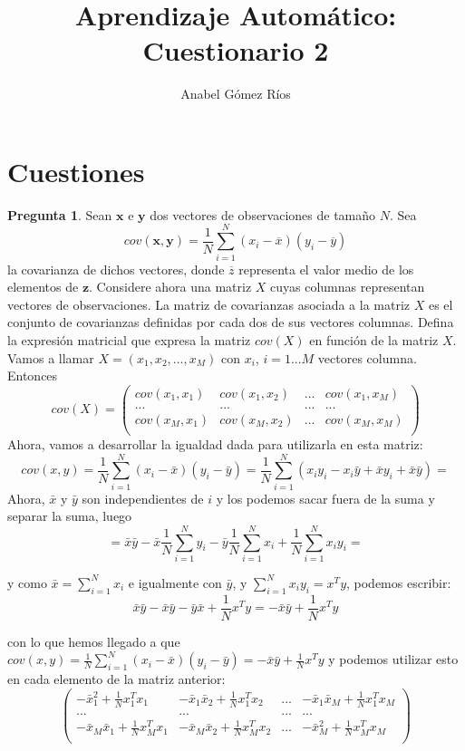 \documentclass[12pt]{article}
\title{Aprendizaje Automático: Cuestionario 2}
\author{Anabel G\'omez R\'ios}
\theoremstyle{definition}
\begin{document}
\maketitle

\newtheorem{pregunta}{Pregunta}

\section{Cuestiones}
\begin{pregunta}
Sean $\mathbf{x}$ e $\mathbf{y}$ dos vectores de observaciones de tamaño $N$. Sea
\[
	cov(\mathbf{x},\mathbf{y})=\frac{1}{N}\sum_{i=1}^N(x_i-\overline{x})(y_i - \overline{y})
\]
la covarianza de dichos vectores, donde $\overline{z}$ representa el valor medio de los elementos de $\mathbf{z}$. Considere ahora una matriz $X$ cuyas columnas representan vectores de observaciones. La matriz de covarianzas asociada a la matriz $X$ es el conjunto de covarianzas definidas por cada dos de sus vectores columnas. Defina la expresión matricial que expresa la matriz $cov(X)$ en función de la matriz $X$.\\

Vamos a llamar $X=(x_1,x_2,...,x_M)$ con $x_i$, $i=1...M$ vectores columna. Entonces
\[ cov(X) = \left( \begin{array}{cccc}
		cov(x_1,x_1) & cov(x_1,x_2) & ... & cov(x_1,x_M) \\
		... & ... & ... & ...\\
		cov(x_M,x_1) & cov(x_M, x_2) & ... & cov(x_M, x_M) \\ \end{array} \right)   
\]
Ahora, vamos a desarrollar la igualdad dada para utilizarla en esta matriz:
\[
	cov(x,y)=\frac{1}{N}\sum_{i=1}^N(x_i-\bar{x})(y_i-\bar{y}) = \frac{1}{N} \sum_{i=1}^N(x_iy_i-x_i\bar{y}+\bar{x}y_i+\bar{x}\bar{y}) =
\]
Ahora, $\bar{x}$ y $\bar{y}$ son independientes de $i$ y los podemos sacar fuera de la suma y separar la suma, luego
\[
	= \bar{x}\bar{y} -\bar{x}\frac{1}{N}\sum_{i=1}^Ny_i - \bar{y}\frac{1}{N} \sum_{i=1}^Nx_i + \frac{1}{N}\sum_{i=1}^Nx_iy_i = 
\]

y como $\bar{x} = \sum_{i=1}^N x_i$ e igualmente con $\bar{y}$, y $\sum_{i=1}^N x_iy_i= x^Ty$, podemos escribir:
\[
	\bar{x}\bar{y} - \bar{x}\bar{y} - \bar{y}\bar{x} + \frac{1}{N}x^Ty = -\bar{x}\bar{y} + \frac{1}{N}x^Ty
\]

con lo que hemos llegado a que $cov(x,y)=\frac{1}{N}\sum_{i=1}^N(x_i-\bar{x})(y_i-\bar{y}) = -\bar{x}\bar{y} + \frac{1}{N}x^Ty$ y podemos utilizar esto en cada elemento de la matriz anterior:
\[ \left( \begin{array}{cccc}
		-\bar{x}_1^2 + \frac{1}{N}x_1^Tx_1 & -\bar{x}_1\bar{x}_2 + \frac{1}{N}x_1^Tx_2 & ... & -\bar{x}_1\bar{x}_M + \frac{1}{N}x_1^Tx_M \\
		... & ... & ... & ...\\
		-\bar{x}_M\bar{x}_1 + \frac{1}{N}x_M^Tx_1 & -\bar{x}_M\bar{x}_2 + \frac{1}{N}x_M^Tx_2 & ... & -\bar{x}_M^2 + \frac{1}{N}x_M^Tx_M \\ \end{array} \right)   
\]


\end{pregunta}
\end{document}
